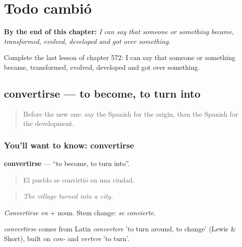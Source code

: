 
\chapter{Todo cambió}
\label{ch:es-todo-cambio}

\begin{chapteropening}
\textbf{By the end of this chapter:} \emph{I can say that someone or something became, transformed, evolved, developed and got over something.}

Complete the last lesson of chapter 572: I can say that someone or something became, transformed, evolved, developed and got over something.
\end{chapteropening}

\section[convertirse]{convertirse — to become, to turn into}

\label{lesson:ES-C572-convertirse}



\begin{quote}
Before the new one: say the Spanish for the origin, then the Spanish for the development.
\end{quote}

\subsection*{You'll want to know: convertirse}
\textbf{convertirse} — \textquotedblleft{}to become, to turn into\textquotedblright{}.

\begin{quote}
El pueblo se convirtió en una ciudad.
\end{quote}

\begin{quote}
\emph{The village turned into a city.}
\end{quote}

\emph{Convertirse en} + noun. Stem change: \emph{se convierte}.

\begin{cousinweb}
\emph{convertirse} comes from Latin \emph{convertere} 'to turn around, to change' (Lewis \& Short), built on \emph{con-} and \emph{vertere} 'to turn'.
\end{cousinweb}


